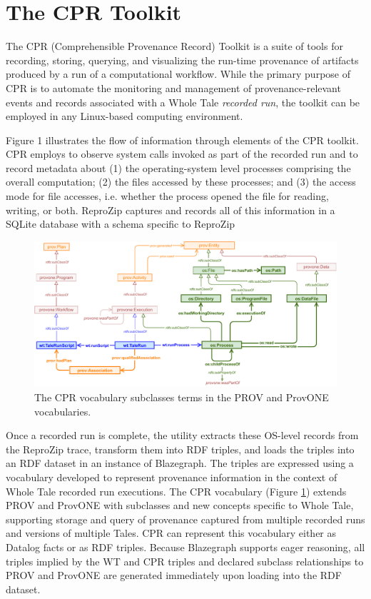 \section{The CPR Toolkit}

The CPR (Comprehensible Provenance Record) Toolkit is a suite of tools for recording, storing, querying, and visualizing the run-time provenance of artifacts produced by a run of a computational workflow. While the primary purpose of CPR  is to automate the monitoring and management of provenance-relevant events and records associated with a Whole Tale \emph{recorded run}, the toolkit can be employed in any Linux-based computing environment.

Figure 1 illustrates the flow of information through elements of the CPR toolkit. CPR employs  to observe system calls invoked as part of the recorded run and to record metadata about (1) the operating-system level processes comprising the overall computation; (2) the files accessed by these processes; and (3) the access mode for file accesses, i.e. whether the process opened the file for reading, writing, or both. ReproZip captures and records all of this information in a SQLite database with a schema specific to ReproZip

\begin{figure}
    \includegraphics[width=\linewidth]{figures/cpr-vocab.pdf}
    \caption{The CPR vocabulary subclasses terms in the PROV and ProvONE vocabularies.}
    \label{fig:cpr-vocab}
\end{figure}

Once a recorded run is complete, the  utility extracts these OS-level records from the ReproZip trace, transform them into RDF triples, and loads the triples into an RDF dataset in an instance of Blazegraph. The triples are expressed using a vocabulary developed to represent provenance information in the context of Whole Tale recorded run executions. The CPR vocabulary (Figure \ref{fig:cpr-vocab}) extends PROV and ProvONE with subclasses and new concepts specific to Whole Tale, supporting storage and query of provenance captured from multiple recorded runs and versions of multiple Tales. CPR can represent this vocabulary either as Datalog facts or as RDF triples. Because Blazegraph supports eager reasoning, all triples implied by the WT and CPR triples and declared subclass relationships to PROV and ProvONE are generated immediately upon loading into the RDF dataset. 

